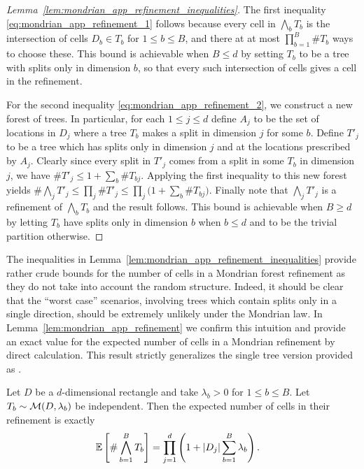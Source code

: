\begin{proof}[Lemma~\ref{lem:mondrian_app_refinement_inequalities}]

  The first inequality \eqref{eq:mondrian_app_refinement_1}
  follows because every cell in
  $\bigwedge_b T_b$ is the intersection of cells
  $D_b \in T_b$ for $1 \leq b \leq B$, and there at at most
  $\prod_{b=1}^{B} \# T_b$ ways to choose these.
  This bound is achievable when $B \leq d$ by setting
  $T_b$ to be a tree with splits only in dimension $b$,
  so that every such intersection of cells
  gives a cell in the refinement.

  For the second inequality \eqref{eq:mondrian_app_refinement_2},
  we construct a new forest of trees.
  In particular, for each $1 \leq j \leq d$ define
  $A_j$ to be the set of locations in $D_j$ where a tree $T_b$
  makes a split in dimension $j$ for some $b$.
  Define $T'_j$ to be a tree which has splits
  only in dimension $j$ and at the locations prescribed by $A_j$.
  Clearly since every split in $T'_j$
  comes from a split in some $T_b$ in dimension $j$,
  we have $\# T'_j \leq 1 + \sum_b \# T_{b j}$.
  Applying the first inequality to this new forest yields
  $\# \bigwedge_j T'_j \leq \prod_j \# T'_j
  \leq \prod_j \big( 1 + \sum_b \# T_{b j} \big)$.
  Finally note that $\bigwedge_j T'_j$
  is a refinement of $\bigwedge_b T_b$ and the result follows.
  This bound is achievable when $B \geq d$ by letting
  $T_b$ have splits only in dimension $b$ when $b \leq d$
  and to be the trivial partition otherwise.
\end{proof}

The inequalities in Lemma~\ref{lem:mondrian_app_refinement_inequalities} provide
rather crude bounds for the number of cells in a Mondrian forest
refinement as they do not take into account the random structure.
Indeed, it should be clear that the ``worst case'' scenarios, involving
trees which contain splits only in a single direction, should be extremely
unlikely under the Mondrian law. In Lemma~\ref{lem:mondrian_app_refinement} we
confirm
this intuition and provide an exact value for the expected number of cells
in a Mondrian refinement by direct calculation. This result strictly generalizes
the single tree version provided as \citet[Proposition~2]{mourtada2020minimax}.

\begin{lemma}
  \label{lem:mondrian_app_refinement}

  Let $D$ be a $d$-dimensional rectangle
  and take $\lambda_b > 0$ for $1 \leq b \leq B$.
  Let $T_b \sim \mathcal{M}(D, \lambda_b)$ be independent.
  Then the expected number of cells in their refinement is exactly
  \begin{align*}
    \mathbb{E}\left[\# \bigwedge_{b=1}^B T_b \right]
    &= \prod_{j=1}^d \left(
      1 + |D_j| \sum_{b=1}^B \lambda_b
    \right).
  \end{align*}
\end{lemma}


